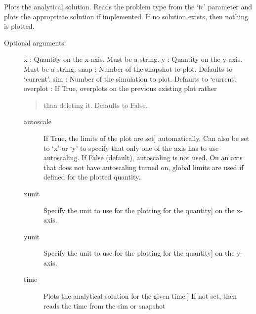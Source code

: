 \documentclass[letterpaper,10pt,english]{sphinxmanual}
\begin{document}
\begin{fulllineitems}
\label{index:facade.plotanalytical}
Plots the analytical solution.  Reads the problem type from the `ic'
parameter and plots the appropriate solution if implemented.  If no solution
exists, then nothing is plotted.
\begin{description}
\item[{Optional arguments:}] \leavevmode
x          : Quantity on the x-axis. Must be a string.
y          : Quantity on the y-axis. Must be a string.
snap       : Number of the snapshot to plot. Defaults to `current'.
sim        : Number of the simulation to plot. Defaults to `current'.
overplot   : If True, overplots on the previous existing plot rather
\begin{quote}

than deleting it. Defaults to False.
\end{quote}
\begin{description}
\item[{autoscale}] \leavevmode{[}If True, the limits of the plot are set{]}
automatically.  Can also be set to `x' or `y' to specify
that only one of the axis has to use autoscaling.
If False (default), autoscaling is not used. On an axis that does
not have autoscaling turned on, global limits are used
if defined for the plotted quantity.

\item[{xunit}] \leavevmode{[}Specify the unit to use for the plotting for the quantity{]}
on the x-axis.

\item[{yunit}] \leavevmode{[}Specify the unit to use for the plotting for the quantity{]}
on the y-axis.

\item[{time}] \leavevmode{[}Plots the analytical solution for the given time.{]}
If not set, then reads the time from the sim or snapshot

\end{description}

\end{description}

\end{fulllineitems}

\end{document}
